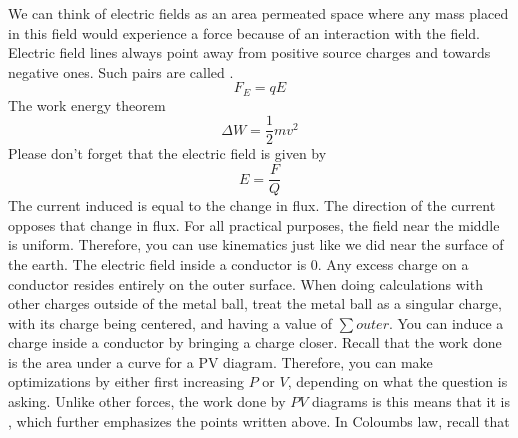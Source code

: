 {}\markdownRendererInterblockSeparator
{}\markdownRendererUlBegin
\markdownRendererUlItem We can think of electric fields as an area permeated space where any mass placed in this field would experience a force because of an interaction with the field.\markdownRendererUlItemEnd 
\markdownRendererUlItem Electric field lines always point away from positive source charges and towards negative ones. Such pairs are called .\markdownRendererUlItemEnd 
\markdownRendererUlEnd \markdownRendererInterblockSeparator
{}$$ F_E = qE $$\markdownRendererInterblockSeparator
{}\markdownRendererUlBegin
\markdownRendererUlItem The work energy theorem $$\Delta W = \frac{1}{2}mv^2$$\markdownRendererUlItemEnd 
\markdownRendererUlItem Please don't forget that the electric field is given by $$E = \frac{F}{Q}$$\markdownRendererUlItemEnd 
\markdownRendererUlItem The current induced is equal to the change in flux. The direction of the current opposes that change in flux.\markdownRendererUlItemEnd 
\markdownRendererUlEnd \markdownRendererInterblockSeparator
{}\markdownRendererInterblockSeparator
{}For all practical purposes, the field near the middle is uniform. Therefore, you can use kinematics just like we did near the surface of the earth.\markdownRendererInterblockSeparator
{}\markdownRendererInterblockSeparator
{}\markdownRendererUlBeginTight
\markdownRendererUlItem The electric field inside a conductor is $0$.\markdownRendererUlItemEnd 
\markdownRendererUlItem Any excess charge on a conductor resides entirely on the outer surface.\markdownRendererUlItemEnd 
\markdownRendererUlItem When doing calculations with other charges outside of the metal ball, treat the metal ball as a singular charge, with its charge being centered, and having a value of $\sum outer$.\markdownRendererUlItemEnd 
\markdownRendererUlItem You can induce a charge inside a conductor by bringing a charge closer.\markdownRendererUlItemEnd 
\markdownRendererUlEndTight \markdownRendererInterblockSeparator
{}\markdownRendererInterblockSeparator
{}\markdownRendererUlBeginTight
\markdownRendererUlItem Recall that the work done is the area under a curve for a PV diagram. Therefore, you can make optimizations by either first increasing $P$ or $V$, depending on what the question is asking.\markdownRendererUlItemEnd 
\markdownRendererUlItem Unlike other forces, the work done by $PV$ diagrams is  this means that it is , which further emphasizes the points written above.\markdownRendererUlItemEnd 
\markdownRendererUlEndTight \markdownRendererInterblockSeparator
{}\markdownRendererInterblockSeparator
{}\markdownRendererInterblockSeparator
{}\markdownRendererUlBeginTight
\markdownRendererUlItem In Coloumbs law, recall that\markdownRendererUlItemEnd 
\markdownRendererUlEndTight \relax